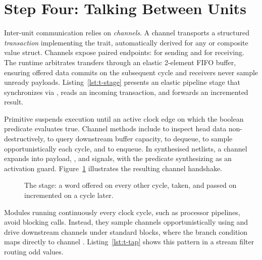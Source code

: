 \documentclass[journal,9pt]{IEEEtran}
\begin{document}
\section{Step Four: Talking Between Units}
\label{sec:t-channels}

Inter-unit communication relies on \emph{channels}. A channel transports a
structured \emph{transaction} implementing the  trait,
automatically derived for any  or composite value struct. Channels
expose paired endpoints:  for sending and  for receiving. The
runtime arbitrates transfers through an elastic 2-element FIFO buffer, ensuring
offered data commits on the subsequent cycle and receivers never sample unready
payloads. Listing~\ref{lst:t-stage} presents an elastic pipeline stage that
synchronizes via , reads an incoming transaction, and forwards an
incremented result.



Primitive  suspends execution until an active
clock edge on which the boolean predicate evaluates true. Channel methods
include  to inspect head data non-destructively,  to query
downstream buffer capacity,  to dequeue,  to sample
 opportunistically each cycle, and  to enqueue.
In synthesised netlists, a channel expands into payload, , and
 signals, with the  predicate synthesizing as an
activation guard. Figure~\ref{fig:t-stage} illustrates the resulting channel
handshake.

\begin{figure}[htbp]
\centering

\caption{The stage: a word offered on  every other cycle,
taken, and passed on incremented on  a cycle later.}
\label{fig:t-stage}
\end{figure}

Modules running continuously every clock cycle, such as processor
pipelines, avoid blocking  calls. Instead, they sample channels
opportunistically using  and drive downstream channels under standard
 blocks, where the branch condition maps directly to channel
. Listing~\ref{lst:t-tap} shows this pattern in a stream filter
routing odd values.
\end{document}
